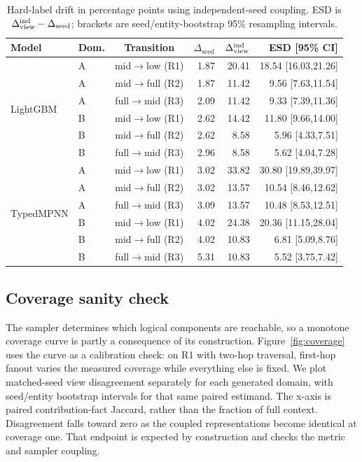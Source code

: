\documentclass[runningheads]{llncs}
\newcommand{\Dview}{\Delta_{\mathrm{view}}}
\newcommand{\Dseed}{\Delta_{\mathrm{seed}}}
\begin{document}
\begin{table}[t]
\centering
\caption{Hard-label drift in percentage points using independent-seed coupling. ESD is $\Dview^{\rm ind}-\Dseed$; brackets are seed/entity-bootstrap 95\% resampling intervals.}
\label{tab:drift}
\scriptsize
\setlength{\tabcolsep}{2.7pt}
\begin{tabular}{llcrrr}
\toprule
Model & Dom. & Transition & $\Dseed$ & $\Dview^{\rm ind}$ & ESD [95\% CI]\\
\midrule
\multirow{6}{*}{LightGBM} & A & mid$\to$low (R1) & 1.87 & 20.41 & 18.54 [16.03,21.26]\\
 & A & mid$\to$full (R2) & 1.87 & 11.42 & 9.56 [7.63,11.54]\\
 & A & full$\to$mid (R3) & 2.09 & 11.42 & 9.33 [7.39,11.36]\\
 & B & mid$\to$low (R1) & 2.62 & 14.42 & 11.80 [9.66,14.00]\\
 & B & mid$\to$full (R2) & 2.62 & 8.58 & 5.96 [4.33,7.51]\\
 & B & full$\to$mid (R3) & 2.96 & 8.58 & 5.62 [4.04,7.28]\\
\midrule
\multirow{6}{*}{TypedMPNN} & A & mid$\to$low (R1) & 3.02 & 33.82 & 30.80 [19.89,39.97]\\
 & A & mid$\to$full (R2) & 3.02 & 13.57 & 10.54 [8.46,12.62]\\
 & A & full$\to$mid (R3) & 3.09 & 13.57 & 10.48 [8.53,12.51]\\
 & B & mid$\to$low (R1) & 4.02 & 24.38 & 20.36 [11.15,28.04]\\
 & B & mid$\to$full (R2) & 4.02 & 10.83 & 6.81 [5.09,8.76]\\
 & B & full$\to$mid (R3) & 5.31 & 10.83 & 5.52 [3.75,7.42]\\
\bottomrule
\end{tabular}
\end{table}

\subsection{Coverage sanity check}
The sampler determines which logical components are reachable, so a monotone coverage curve is partly a consequence of its construction. Figure~\ref{fig:coverage} uses the curve as a calibration check: on R1 with two-hop traversal, first-hop fanout varies the measured coverage while everything else is fixed. We plot matched-seed view disagreement separately for each generated domain, with seed/entity bootstrap intervals for that same paired estimand. The x-axis is paired contribution-fact Jaccard, rather than the fraction of full context. Disagreement falls toward zero as the coupled representations become identical at coverage one. That endpoint is expected by construction and checks the metric and sampler coupling.
\end{document}

